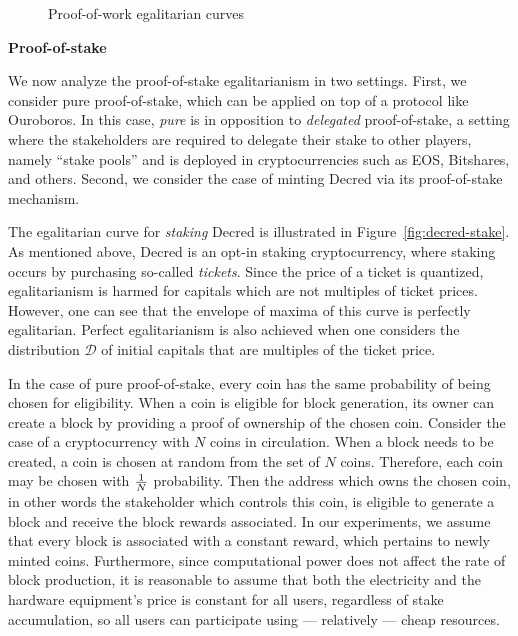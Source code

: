 \begin{figure}
  \caption{Proof-of-work egalitarian curves}
  \label{fig:egalitarian_curves_pow}
\end{figure}

\noindent\textbf{Proof-of-stake}

\noindent
We now analyze the proof-of-stake egalitarianism in two settings. First, we
consider pure proof-of-stake, which can be applied on top of a protocol like
Ouroboros. In this case, \emph{pure} is in opposition to \emph{delegated}
proof-of-stake, a setting where the stakeholders are required to delegate their
stake to other players, namely ``stake pools'' and is deployed in
cryptocurrencies such as EOS, Bitshares, and others. Second, we consider the
case of minting Decred via its proof-of-stake mechanism.

The egalitarian curve for \emph{staking} Decred is illustrated in
Figure~\ref{fig:decred-stake}.
As mentioned above, Decred is an opt-in staking cryptocurrency, where staking
occurs by purchasing so-called \emph{tickets}. Since the price of a ticket is
quantized, egalitarianism is harmed for capitals which are not multiples of
ticket prices. However, one can see that the envelope of maxima of this curve
is perfectly egalitarian. Perfect egalitarianism is also achieved when one
considers the distribution $\mathcal{D}$ of initial capitals that are multiples
of the ticket price.

In the case of pure proof-of-stake, every coin has the same probability of
being chosen for eligibility. When a coin is eligible for block generation, its
owner can create a block by providing a proof of ownership of the chosen coin.
Consider the case of a cryptocurrency with $N$ coins in circulation. When a
block needs to be created, a coin is chosen at random from the set of $N$
coins. Therefore, each coin may be chosen with $1 \over N$ probability. Then
the address which owns the chosen coin, in other words the stakeholder which
controls this coin, is eligible to generate a block and receive the block
rewards associated. In our experiments, we assume that every block is
associated with a constant reward, which pertains to newly minted coins.
Furthermore, since computational power does not affect the rate of block
production, it is reasonable to assume that both the electricity and the
hardware equipment's price is constant for all users, regardless of stake
accumulation, so all users can participate using --- relatively --- cheap
resources.

